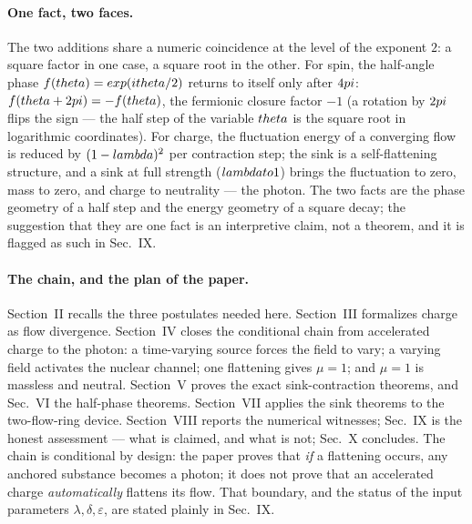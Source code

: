 \documentclass[aps,prd,preprint,superscriptaddress,amsmath,amssymb]{revtex4-2}
\begin{document}
\paragraph{One fact, two faces.}
The two additions share a numeric coincidence at the level of the
exponent $2$: a square factor in one case, a square root in the
other.  For spin, the half-angle phase $f(\\theta)=\\exp(i\\theta/2)$
returns to itself only after $4\\pi$: $f(\\theta+2\\pi)=-f(\\theta)$,
the fermionic closure factor $-1$ (a rotation by $2\\pi$ flips the sign
--- the half step of the variable $\\theta$ is the square root in
logarithmic coordinates).  For charge, the fluctuation energy of a
converging flow is reduced by $(1-\\lambda)^2$ per contraction step;
the sink is a self-flattening structure, and a sink at full strength
($\\lambda\\to 1$) brings the fluctuation to zero, mass to zero, and
charge to neutrality --- the photon.  The two facts are the phase
geometry of a half step and the energy geometry of a square decay;
the suggestion that they are one fact is an interpretive claim, not a
theorem, and it is flagged as such in Sec.~IX.

\paragraph{The chain, and the plan of the paper.}
Section~II recalls the three postulates needed here.  Section~III
formalizes charge as flow divergence.  Section~IV closes the
conditional chain from accelerated charge to the photon: a
time-varying source forces the field to vary; a varying field activates
the nuclear channel; one flattening gives $\mu=1$; and $\mu=1$ is
massless and neutral.  Section~V proves the exact sink-contraction
theorems, and Sec.~VI the half-phase theorems.  Section~VII applies the
sink theorems to the two-flow-ring device.  Section~VIII reports the
numerical witnesses; Sec.~IX is the honest assessment --- what is
claimed, and what is not; Sec.~X concludes.  The chain is conditional
by design: the paper proves that \emph{if} a flattening occurs, any
anchored substance becomes a photon; it does not prove that an
accelerated charge \emph{automatically} flattens its flow.  That
boundary, and the status of the input parameters $\lambda,\delta,
\varepsilon$, are stated plainly in Sec.~IX.
\end{document}
